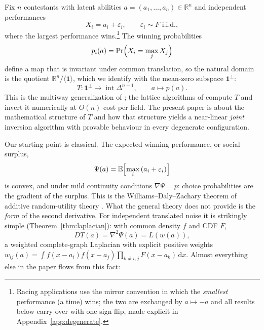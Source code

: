 \documentclass[11pt]{article}
\theoremstyle{definition}
\theoremstyle{remark}
\newcommand{\R}{\mathbb{R}}
\newcommand{\one}{\mathbf{1}}
\newcommand{\intsimplex}{\operatorname{int}\Delta^{n-1}}
\newcommand{\perpone}{\one^{\perp}}
\newcommand{\dd}{\,\mathrm{d}}
\begin{document}
Fix $n$ contestants with latent abilities $a = (a_1,\dots,a_n) \in \R^n$ and
independent performances
\begin{equation}
  X_i = a_i + \varepsilon_i,
  \qquad \varepsilon_i \sim F \text{ i.i.d.},
  \label{eq:model}
\end{equation}
where the largest performance wins.\footnote{Racing applications use the
mirror convention in which the \emph{smallest} performance (a time) wins; the
two are exchanged by $a \mapsto -a$ and all results below carry over with one
sign flip, made explicit in Appendix~\ref{app:degenerate}.}  The winning
probabilities
\begin{equation}
  p_i(a) = \Pr\Bigl(X_i = \max_j X_j\Bigr)
  \label{eq:pmap}
\end{equation}
define a map that is invariant under common translation, so the natural
domain is the quotient $\R^n / \langle \one \rangle$, which we identify with
the mean-zero subspace $\perpone$:
\[
  T : \perpone \longrightarrow \intsimplex, \qquad a \mapsto p(a).
\]
This is the multiway generalization of \textcite{thurstone1927}; the lattice
algorithms of \textcite{cotton2021} compute $T$ and invert it numerically at
$O(n)$ cost per field.  The present paper is about the mathematical structure
of $T$ and how that structure yields a near-linear \emph{joint} inversion
algorithm with provable behaviour in every degenerate configuration.

Our starting point is classical.  The expected winning performance, or social
surplus,
\begin{equation}
  \Psi(a) = \mathbb{E}\Bigl[\max_i\, (a_i + \varepsilon_i)\Bigr]
  \label{eq:surplus}
\end{equation}
is convex, and under mild continuity conditions $\nabla \Psi = p$: choice
probabilities are the gradient of the surplus.  This is the
Williams--Daly--Zachary theorem of additive random-utility theory
\parencite{williams1977,daly1978,mcfadden1981}.  What the general theory does
not provide is the \emph{form} of the second derivative.  For independent
translated noise it is strikingly simple (Theorem~\ref{thm:laplacian}): with
common density $f$ and CDF $F$,
\[
  D T(a) = \nabla^2 \Psi(a) = L(w(a)),
\]
a weighted complete-graph Laplacian with explicit positive weights
$w_{ij}(a) = \int f(x-a_i) f(x-a_j) \prod_{k \ne i,j} F(x-a_k) \dd x$.
Almost everything else in the paper flows from this fact:
\end{document}
